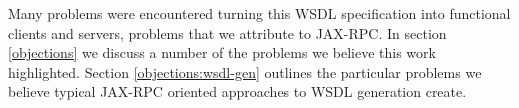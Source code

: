 Many problems were encountered turning this WSDL specification into
functional clients and servers, problems that we attribute to JAX-RPC.
In section \ref{objections} we discuss a number of the problems we
believe this work highlighted. Section \ref{objections:wsdl-gen}
outlines the particular problems we believe typical JAX-RPC oriented
approaches to WSDL generation create.








